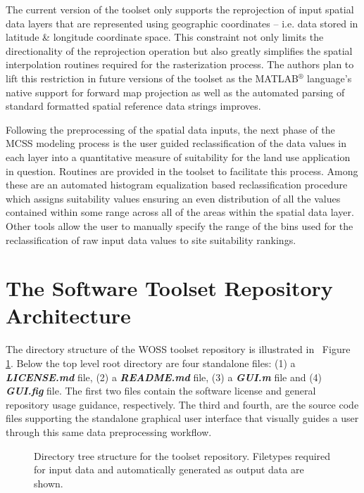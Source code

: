 The current version of the toolset only supports the reprojection of input spatial data layers that are represented using geographic coordinates -- i.e. data stored in latitude \& longitude coordinate space. This constraint not only limits the directionality of the reprojection operation but also greatly simplifies the spatial interpolation routines required for the rasterization process. The authors plan to lift this restriction in future versions of the toolset as the MATLAB$^{\circledR}$ language's native support for forward map projection as well as the automated parsing of standard formatted spatial reference data strings improves.   
            
Following the preprocessing of the spatial data inputs, the next phase of the MCSS modeling process is the user guided reclassification of the data values in each layer into a quantitative measure of suitability for the land use application in question. Routines are provided in the toolset to facilitate this process. Among these are an automated histogram equalization based reclassification procedure which assigns suitability values ensuring an even distribution of all the values contained within some range across all of the areas within the spatial data layer. Other tools allow the user to manually specify the range of the bins used for the reclassification of raw input data values to site suitability rankings. 

\section{The Software Toolset Repository Architecture}
    
The directory structure of the WOSS toolset repository is illustrated in ~Figure \ref{fig:Directory}. Below the top level root directory are four standalone files: (1) a \textit{\textbf{LICENSE.md}} file, (2) a  \textit{\textbf{README.md}} file, (3) a \textit{\textbf{GUI.m}} file and (4) \textit{\textbf{GUI.fig}} file. The first two files contain the software license and general repository usage guidance, respectively. The third and fourth, are the source code files supporting the standalone graphical user interface that visually guides a user through this same data preprocessing workflow.

        \begin{figure}[!h]
            \caption{Directory tree structure for the toolset repository. Filetypes required for input data and automatically generated as output data are shown.}
              \label{fig:Directory}
        \end{figure}
        
